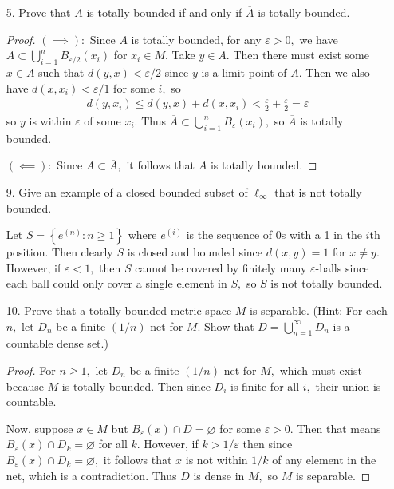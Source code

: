 \documentclass{article}
\begin{document}
\begin{itemize}
	\item[5.] Prove that $A$ is totally bounded if and only if $\overline{A}$ is totally bounded.
		\begin{proof}
			$(\implies):$ Since $A$ is totally bounded, for any $\varepsilon>0,$ we have $A\subset \bigcup_{i=1}^n B_{\varepsilon/2}(x_i)$ for $x_i\in M.$ Take $y\in \overline{A}.$ Then there must exist some $x\in A$ such that $d(y, x)<\varepsilon/2$ since $y$ is a limit point of $A.$ Then we also have $d(x, x_i)<\varepsilon/1$ for some $i,$ so 
			\begin{align*}
				d(y, x_i) \le d(y, x) + d(x, x_i) < \frac{\varepsilon}{2} + \frac{\varepsilon}{2} = \varepsilon
			\end{align*}
			so $y$ is within $\varepsilon$ of some $x_i.$ Thus $\overline{A}\subset \bigcup_{i=1}^n B_\varepsilon(x_i),$ so $\overline{A}$ is totally bounded.

			$(\impliedby):$ Since $A\subset \overline{A},$ it follows that $A$ is totally bounded.
		\end{proof}

	\item[9.] Give an example of a closed bounded subset of $\ell_\infty$ that is not totally bounded.
		\begin{soln}
			Let $S=\left\{ e^{(n)}:n\ge 1 \right\}$ where $e^{(i)}$ is the sequence of 0s with a 1 in the $i$th position. Then clearly $S$ is closed and bounded since $d(x, y)=1$ for $x\neq y.$ However, if $\varepsilon<1,$ then $S$ cannot be covered by finitely many $\varepsilon$-balls since each ball could only cover a single element in $S,$ so $S$ is not totally bounded.
		\end{soln}

	\item[10.] Prove that a totally bounded metric space $M$ is separable. (Hint: For each $n,$ let $D_n$ be a finite $(1/n)$-net for $M.$ Show that $D=\bigcup_{n=1}^\infty D_n$ is a countable dense set.)
		\begin{proof}
			For $n\ge 1,$ let $D_n$ be a finite $(1/n)$-net for $M,$ which must exist because $M$ is totally bounded. Then since $D_i$ is finite for all $i,$ their union is countable.

			Now, suppose $x\in M$ but $B_\varepsilon(x)\cap D=\varnothing$ for some $\varepsilon>0.$ Then that means $B_\varepsilon(x)\cap D_k=\varnothing$ for all $k.$ However, if $k>1/\varepsilon$ then since $B_\varepsilon(x)\cap D_k=\varnothing,$ it follows that $x$ is not within $1/k$ of any element in the net, which is a contradiction. Thus $D$ is dense in $M,$ so $M$ is separable.
		\end{proof}


\end{itemize}
\end{document}
